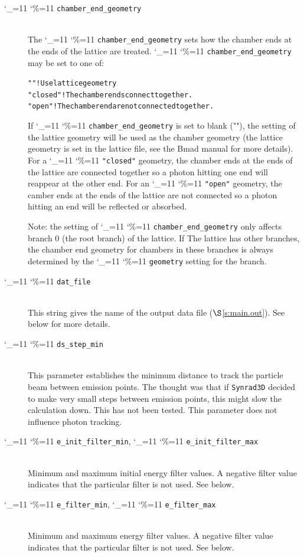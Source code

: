 \documentclass[11pt,openany]{report}
\newcommand{\sref}[1]{$\S$\ref{#1}}
\newcommand{\srthree}{\texttt{Synrad3D}\xspace}
\newcommand\ttcmd{\begingroup\catcode`\_=11 \catcode`\%=11 \dottcmd}
\newcommand\dottcmd[1]{\texttt{#1}\endgroup}
\newcommand{\vn}{\ttcmd}
\newcommand{\Newline}{\hfil \\}
\newlength{\ExBeg}
\newlength{\ExEnd}
\newenvironment{example}
  {\vspace{\ExBeg} \begin{alltt}}
  {\end{alltt} \vspace{\ExEnd}}
\begin{document}
  \begin{description}
  \item[\vn{chamber_end_geometry}] \Newline
The \vn{chamber_end_geometry} sets how the chamber ends at the ends of the lattice
are treated. \vn{chamber_end_geometry} may be set to one of:
\begin{example}
  ""            ! Use lattice geometry
  "closed"      ! The chamber ends connect together.
  "open"        ! The chamber end are not connected together.
\end{example}
If \vn{chamber_end_geometry} is set to blank (""), the setting of the lattice geometry
will be used as the chamber geometry (the lattice geometry is set in the lattice file, see
the Bmad manual\cite{b:bmad} for more details). For a \vn{"closed"} geometry, the chamber
ends at the ends of the lattice are connected together so a photon hitting one end will
reappear at the other end.  For an \vn{"open"} geometry, the camber ends at the ends of
the lattice are not connected so a photon hitting an end will be reflected or absorbed.

Note: the setting of \vn{chamber_end_geometry} only affects branch 0 (the root branch) of
the lattice. If The lattice has other branches, the chamber end geometry for chambers in
these branches is always determined by the \vn{geometry} setting for the branch.

  \item[\vn{dat_file}] \Newline
This string gives the name of the output data file (\sref{s:main.out}).
See below for more details.

  \item[\vn{ds_step_min}] \Newline
This parameter establishes the minimum distance to track the particle beam between emission
points. The thought was that if \srthree decided to make very small steps  between emission
points, this might slow the calculation down. This has not been tested. This parameter
does not influence photon tracking.

  \item[\vn{e_init_filter_min}, \vn{e_init_filter_max}] \Newline
Minimum and maximum initial energy filter values. A negative filter value
indicates that the particular filter is not used. See below.

  \item[\vn{e_filter_min}, \vn{e_filter_max}] \Newline
Minimum and maximum energy filter values. A negative filter value
indicates that the particular filter is not used. See below.


\end{description}
\end{document}

